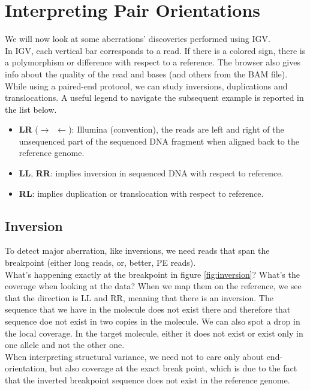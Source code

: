 \section{Interpreting Pair Orientations}
We will now look at some aberrations' discoveries performed using IGV.\\
In IGV, each vertical bar corresponds to a read.
If there is a colored sign, there is a polymorphism or difference with respect to a reference.
The browser also gives info about the quality of the read and bases (and others from the BAM file).\\
While using a paired-end protocol, we can study inversions, duplications and translocations. A useful legend to navigate the subsequent example is reported in the list below.
\begin{itemize}
\item \textbf{LR} ($\rightarrow \, \, \, \leftarrow$): Illumina (convention), the reads are left and right of the unsequenced part of the sequenced DNA fragment when aligned back to the reference genome.
\item \textbf{LL}, \textbf{RR}: implies inversion in sequenced DNA with respect to reference.
\item \textbf{RL}: implies duplication or translocation with respect to reference.

\end{itemize}

\subsection{Inversion}
To detect major aberration, like inversions, we need reads that span the breakpoint (either long reads, or, better, PE reads). \\
What's happening exactly at the breakpoint in figure \ref{fig:inversion}? What's the coverage when looking at the data?  When we map them on the reference, we see that the direction is LL and RR, meaning that there is an inversion.
The sequence that we have in the molecule does not exist there and therefore that sequence doe not exist in two copies in the molecule.
We can also spot a drop in the local coverage.
In the target molecule, either it does not exist or exist only in one allele and not the other one. \\
When interpreting structural variance, we need not to care only about end-orientation, but also coverage at the exact break point, which is due to the fact that the inverted breakpoint sequence does not exist in the reference genome.

